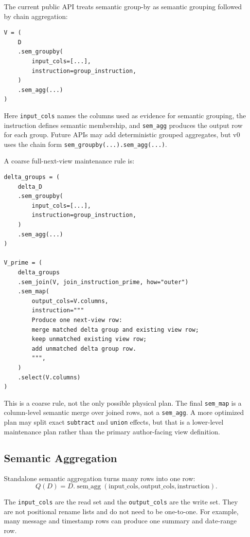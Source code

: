 \documentclass[11pt]{article}
\newcommand{\D}{D}
\newcommand{\Q}{Q}
\newcommand{\SemAgg}{\operatorname{sem\_agg}}
\begin{document}
The current public API treats semantic group-by as semantic grouping followed by
chain aggregation:

\begin{verbatim}
V = (
    D
    .sem_groupby(
        input_cols=[...],
        instruction=group_instruction,
    )
    .sem_agg(...)
)
\end{verbatim}

Here \texttt{input\_cols} names the columns used as evidence for semantic
grouping, the instruction defines semantic membership, and
\texttt{sem\_agg} produces the output row for each group. Future APIs may add
deterministic grouped aggregates, but v0 uses the chain form
\texttt{sem\_groupby(...).sem\_agg(...)}.

A coarse full-next-view maintenance rule is:

\begin{verbatim}
delta_groups = (
    delta_D
    .sem_groupby(
        input_cols=[...],
        instruction=group_instruction,
    )
    .sem_agg(...)
)

V_prime = (
    delta_groups
    .sem_join(V, join_instruction_prime, how="outer")
    .sem_map(
        output_cols=V.columns,
        instruction="""
        Produce one next-view row:
        merge matched delta group and existing view row;
        keep unmatched existing view row;
        add unmatched delta group row.
        """,
    )
    .select(V.columns)
)
\end{verbatim}

This is a coarse rule, not the only possible physical plan. The final
\texttt{sem\_map} is a column-level semantic merge over joined rows, not a
\texttt{sem\_agg}. A more optimized plan may split exact \texttt{subtract} and
\texttt{union} effects, but that is a lower-level maintenance plan rather than
the primary author-facing view definition.

\subsection{Semantic Aggregation}

Standalone semantic aggregation turns many rows into one row:
\[
  \Q(\D)
  =
  \D.\SemAgg(\mathrm{input\_cols},\mathrm{output\_cols},
  \mathrm{instruction}).
\]

The \texttt{input\_cols} are the read set and the \texttt{output\_cols} are the
write set. They are not positional rename lists and do not need to be
one-to-one. For example, many message and timestamp rows can produce one
summary and date-range row.
\end{document}
